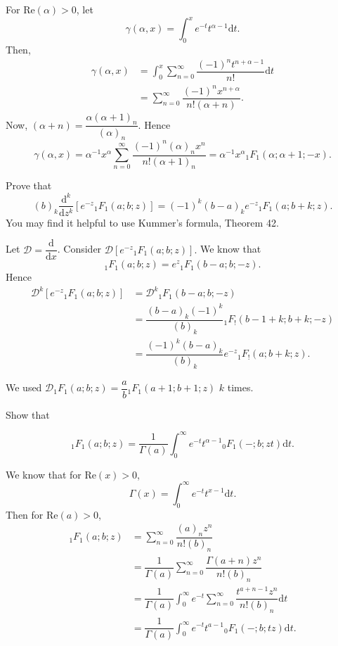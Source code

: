 \begin{solution}
For $\mathrm{Re}(\alpha)>0$, let 
$$\gamma(\alpha, x) = \displaystyle\int_0^x e^{-t} t^{\alpha -1} \mathrm{d}t.$$
Then,
$$\begin{array}{ll}
\gamma(\alpha, x) &= \displaystyle\int_0^x \displaystyle\sum_{n=0}^{\infty} \dfrac{(-1)^n t^{n + \alpha - 1}}{n!} \mathrm{d}t \\
&= \displaystyle\sum_{n=0}^{\infty} \dfrac{(-1)^n x^{n + \alpha}}{n! (\alpha + n)}.
\end{array}$$
Now, $(\alpha + n) = \dfrac{\alpha (\alpha+1)_n}{(\alpha)_n}.$ Hence
$$\gamma(\alpha,x) = \alpha^{-1}x^{\alpha} \displaystyle\sum_{n=0}^{\infty} \dfrac{(-1)^n (\alpha)_n x^n}{n! (\alpha + 1)_n} = \alpha^{-1}x^{\alpha} {}_1F_1(\alpha; \alpha+1; -x).$$
\end{solution}
\begin{problem}\label{problem3chapter7}
Prove that
$$(b)_k \dfrac{\mathrm{d}^k}{\mathrm{d}z^k} \left[ e^{-z} {}_1F_1(a;b;z) \right] = (-1)^k (b-a)_ke^{-z} {}_1F_1(a;b+k;z).$$
You may find it helpful to use Kummer's formula, Theorem 42.
\end{problem}
\begin{solution}
Let $\mathscr{D} = \dfrac{\mathrm{d}}{\mathrm{d}x}$. Consider $\mathscr{D}[e^{-z} {}_1F_1(a;b;z)].$ We know that
$${}_1F_1(a;b;z) = e^z {}_1F_1(b-a;b;-z).$$
Hence
$$\begin{array}{ll}
\mathscr{D}^k[e^{-z}{}_1F_1(a;b;z)] &= \mathscr{D}^k {}_1F_1(b-a;b;-z) \\
&= \dfrac{(b-a)_k (-1)^k}{(b)_k} {}_1F_!(b-1+k;b+k;-z) \\
&= \dfrac{(-1)^k (b-a)_k}{(b)_k} e^{-z} {}_1F_!(a ; b+k;z).
\end{array}$$

We used $\mathscr{D}{}_1F_1(a;b;z) = \dfrac{a}{b} {}_1F_1(a+1;b+1;z)$ $k$ times.
\end{solution}
\begin{problem}\label{problem4chapter7}
Show that

$${}_1F_1(a;b;z) = \dfrac{1}{\Gamma(a)} \displaystyle\int_0^{\infty} e^{-t}t^{\alpha-1}{}_0F_1(-;b;zt) \mathrm{d}t.$$
\end{problem}
\begin{solution}
We know that for $\mathrm{Re}(x)>0$,
$$\Gamma(x) = \displaystyle\int_0^{\infty} e^{-t} t^{x-1} \mathrm{d}t.$$
Then for $\mathrm{Re}(a)>0$,
$$\begin{array}{ll}
{}_1F_1(a;b;z) &= \displaystyle\sum_{n=0}^{\infty} \dfrac{(a)_n z^n}{n! (b)_n} \\
&= \dfrac{1}{\Gamma(a)} \displaystyle\sum_{n=0}^{\infty} \dfrac{\Gamma(a+n)z^n}{n!(b)_n} \\
&= \dfrac{1}{\Gamma(a)} \displaystyle\int_0^{\infty} e^{-t} \displaystyle\sum_{n=0}^{\infty} \dfrac{t^{a+n-1}z^n}{n! (b)_n} \mathrm{d}t \\
&= \dfrac{1}{\Gamma(a)} \displaystyle\int_0^{\infty} e^{-t} t^{a-1} {}_0F_1(-;b;tz)\mathrm{d}t.
\end{array}$$
\end{solution}
